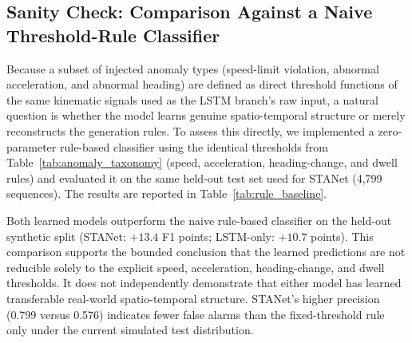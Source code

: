 \documentclass[journal]{IEEEtran}
\begin{document}
\subsection{Sanity Check: Comparison Against a Naive Threshold-Rule Classifier}
Because a subset of injected anomaly types (speed-limit violation, abnormal acceleration, and abnormal heading) are defined as direct threshold functions of the same kinematic signals used as the LSTM branch's raw input, a natural question is whether the model learns genuine spatio-temporal structure or merely reconstructs the generation rules. To assess this directly, we implemented a zero-parameter rule-based classifier using the identical thresholds from Table~\ref{tab:anomaly_taxonomy} (speed, acceleration, heading-change, and dwell rules) and evaluated it on the same held-out test set used for STANet (4,799 sequences). The results are reported in Table~\ref{tab:rule_baseline}.

\begin{table}[!htbp]
  \centering
  \caption{STANet versus a naive zero-parameter threshold-rule classifier on the test set}
  \label{tab:rule_baseline}
  \renewcommand{\arraystretch}{1.15}
\end{table}

Both learned models outperform the naive rule-based classifier on the held-out synthetic split (STANet: $+13.4$ F1 points; LSTM-only: $+10.7$ points). This comparison supports the bounded conclusion that the learned predictions are not reducible solely to the explicit speed, acceleration, heading-change, and dwell thresholds. It does not independently demonstrate that either model has learned transferable real-world spatio-temporal structure. STANet's higher precision (0.799 versus 0.576) indicates fewer false alarms than the fixed-threshold rule only under the current simulated test distribution.
\end{document}

